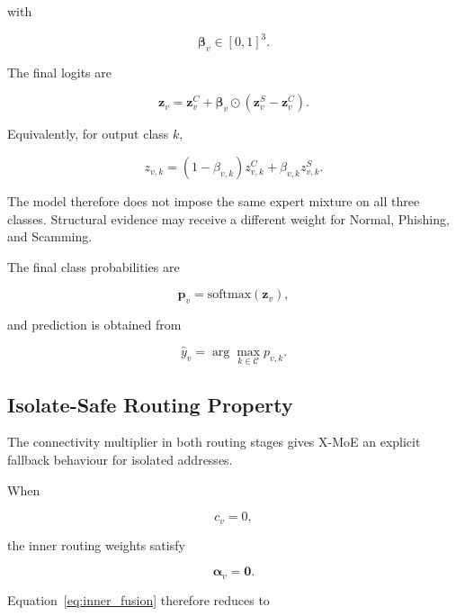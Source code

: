 \documentclass{ieeeaccess}
\begin{document}
with

\begin{equation}
\boldsymbol{\beta}_v
\in [0,1]^3.
\end{equation}

The final logits are

\begin{equation}
\mathbf{z}_v
=
\mathbf{z}^{C}_v
+
\boldsymbol{\beta}_v
\odot
\left(
\mathbf{z}^{S}_v
-
\mathbf{z}^{C}_v
\right).
\label{eq:outer_fusion}
\end{equation}

Equivalently, for output class \(k\),

\begin{equation}
z_{v,k}
=
(1-\beta_{v,k})z^{C}_{v,k}
+
\beta_{v,k}z^{S}_{v,k}.
\end{equation}

The model therefore does not impose the same expert mixture on all three classes. Structural evidence may receive a different weight for Normal, Phishing, and Scamming.

The final class probabilities are

\begin{equation}
\mathbf{p}_v
=
\mathrm{softmax}(\mathbf{z}_v),
\end{equation}

and prediction is obtained from

\begin{equation}
\hat{y}_v
=
\arg\max_{k \in \mathcal{C}} p_{v,k}.
\end{equation}


\subsection{Isolate-Safe Routing Property}

The connectivity multiplier in both routing stages gives X-MoE an explicit fallback behaviour for isolated addresses.

When

\begin{equation}
c_v=0,
\end{equation}

the inner routing weights satisfy

\begin{equation}
\boldsymbol{\alpha}_v=\mathbf{0}.
\end{equation}

Equation~\ref{eq:inner_fusion} therefore reduces to
\end{document}
